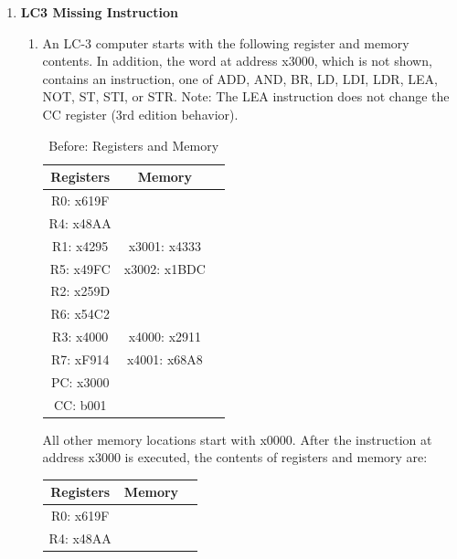 \documentclass{article}
\begin{document}
\begin{enumerate}[label=(\alph*)]
        \item \textbf{LC3 Missing Instruction}
        \begin{enumerate}[label=(\roman*)]
            \item An LC-3 computer starts with the following register and memory contents. In addition, the word at address x3000, which is not shown, contains an instruction, one of ADD, AND, BR, LD, LDI, LDR, LEA, NOT, ST, STI, or STR. Note: The LEA instruction does not change the CC register (3rd edition behavior).
            \begin{table}[h]
            \centering
            \begin{tabular}{|c|c|c|}
            \hline
            \textbf{Registers} & \textbf{Memory} & \\
            \hline
            R0: x619F & & \\
            \hline
            R4: x48AA & & \\
            \hline
            R1: x4295 & x3001: x4333 & \\
            \hline
            R5: x49FC & x3002: x1BDC & \\
            \hline
            R2: x259D & & \\
            \hline
            R6: x54C2 & & \\
            \hline
            R3: x4000 & x4000: x2911 & \\
            \hline
            R7: xF914 & x4001: x68A8 & \\
            \hline
            PC: x3000 & & \\
            \hline
            CC: b001 & & \\
            \hline
            \end{tabular}
            \caption{Before: Registers and Memory}
            \end{table}
            \newline
            All other memory locations start with x0000. After the instruction at address x3000 is executed, the contents of registers and memory are:
            \begin{table}[h]
            \centering
            \begin{tabular}{|c|c|c|}
            \hline
            \textbf{Registers} & \textbf{Memory} & \\
            \hline
            R0: x619F & & \\
            \hline
            R4: x48AA & & \\

\end{tabular}
\end{table}
\end{enumerate}
\end{enumerate}
\end{document}
